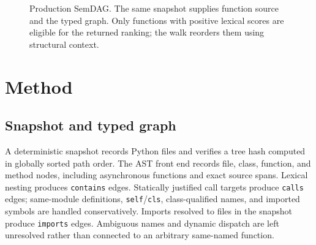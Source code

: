 \documentclass[11pt]{article}
\begin{document}
\begin{figure}[t]
\centering
{}
\caption{Production SemDAG. The same snapshot supplies function source and the typed graph. Only functions with positive lexical scores are eligible for the returned ranking; the walk reorders them using structural context.}
\label{fig:pipeline}
\end{figure}

\section{Method}
\subsection{Snapshot and typed graph}
A deterministic snapshot records Python files and verifies a tree hash computed in globally sorted path order. The AST front end records file, class, function, and method nodes, including asynchronous functions and exact source spans. Lexical nesting produces \texttt{contains} edges. Statically justified call targets produce \texttt{calls} edges; same-module definitions, \texttt{self}/\texttt{cls}, class-qualified names, and imported symbols are handled conservatively. Imports resolved to files in the snapshot produce \texttt{imports} edges. Ambiguous names and dynamic dispatch are left unresolved rather than connected to an arbitrary same-named function.
\end{document}
